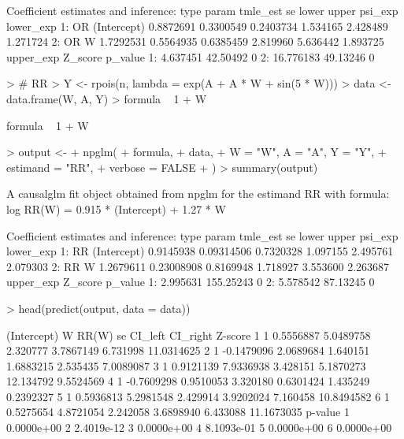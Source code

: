 \documentclass[article]{jss}
\begin{document}
\begin{Schunk}
\begin{Soutput}
Coefficient estimates and inference:
   type       param  tmle_est        se     lower    upper  psi_exp lower_exp
1:   OR (Intercept) 0.8872691 0.3300549 0.2403734 1.534165 2.428489  1.271724
2:   OR           W 1.7292531 0.5564935 0.6385459 2.819960 5.636442  1.893725
   upper_exp  Z_score p_value
1:  4.637451 42.50492       0
2: 16.776183 49.13246       0
\end{Soutput}
\begin{Sinput}
> # RR
> Y <- rpois(n, lambda = exp(A + A * W + sin(5 * W)))
> data <- data.frame(W, A, Y)
> formula ~ 1 + W
\end{Sinput}
\begin{Soutput}
formula ~ 1 + W
\end{Soutput}
\begin{Sinput}
> output <-
+   npglm(
+     formula,
+     data,
+     W = "W", A = "A", Y = "Y",
+     estimand = "RR",
+     verbose = FALSE
+   )
> summary(output)
\end{Sinput}
\begin{Soutput}
A causalglm fit object obtained from npglm for the estimand RR with formula: 
log RR(W) = 0.915 * (Intercept) + 1.27 * W

Coefficient estimates and inference:
   type       param  tmle_est         se     lower    upper  psi_exp lower_exp
1:   RR (Intercept) 0.9145938 0.09314506 0.7320328 1.097155 2.495761  2.079303
2:   RR           W 1.2679611 0.23008908 0.8169948 1.718927 3.553600  2.263687
   upper_exp   Z_score p_value
1:  2.995631 155.25243       0
2:  5.578542  87.13245       0
\end{Soutput}
\begin{Sinput}
> head(predict(output, data = data))
\end{Sinput}
\begin{Soutput}
  (Intercept)          W     RR(W)       se   CI_left  CI_right    Z-score
1           1  0.5556887 5.0489758 2.320777 3.7867149  6.731998 11.0314625
2           1 -0.1479096 2.0689684 1.640151 1.6883215  2.535435  7.0089087
3           1  0.9121139 7.9336938 3.428151 5.1870273 12.134792  9.5524569
4           1 -0.7609298 0.9510053 3.320180 0.6301424  1.435249  0.2392327
5           1  0.5936813 5.2981548 2.429914 3.9202024  7.160458 10.8494582
6           1  0.5275654 4.8721054 2.242058 3.6898940  6.433088 11.1673035
     p-value
1 0.0000e+00
2 2.4019e-12
3 0.0000e+00
4 8.1093e-01
5 0.0000e+00
6 0.0000e+00
\end{Soutput}
\end{Schunk}
\end{document}
